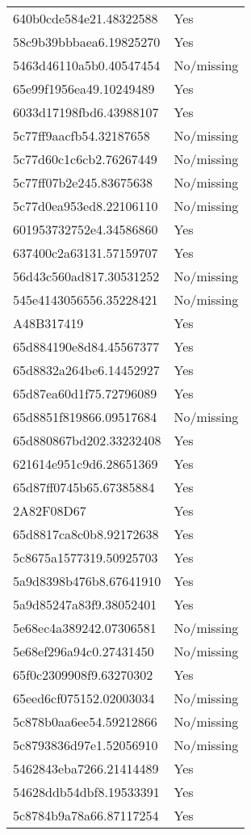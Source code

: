 \begin{tabular}{ll}
640b0cde584e21.48322588 & Yes \\
58c9b39bbbaea6.19825270 & Yes \\
5463d46110a5b0.40547454 & No/missing \\
65e99f1956ea49.10249489 & Yes \\
6033d17198fbd6.43988107 & Yes \\
5c77ff9aacfb54.32187658 & No/missing \\
5c77d60c1c6cb2.76267449 & No/missing \\
5c77ff07b2e245.83675638 & No/missing \\
5c77d0ea953ed8.22106110 & No/missing \\
601953732752e4.34586860 & Yes \\
637400c2a63131.57159707 & Yes \\
56d43c560ad817.30531252 & No/missing \\
545e4143056556.35228421 & No/missing \\
A48B317419 & Yes \\
65d884190e8d84.45567377 & Yes \\
65d8832a264be6.14452927 & Yes \\
65d87ea60d1f75.72796089 & Yes \\
65d8851f819866.09517684 & No/missing \\
65d880867bd202.33232408 & Yes \\
621614e951c9d6.28651369 & Yes \\
65d87ff0745b65.67385884 & Yes \\
2A82F08D67 & Yes \\
65d8817ca8c0b8.92172638 & Yes \\
5c8675a1577319.50925703 & Yes \\
5a9d8398b476b8.67641910 & Yes \\
5a9d85247a83f9.38052401 & Yes \\
5e68ec4a389242.07306581 & No/missing \\
5e68ef296a94c0.27431450 & No/missing \\
65f0c2309908f9.63270302 & Yes \\
65eed6cf075152.02003034 & No/missing \\
5c878b0aa6ee54.59212866 & No/missing \\
5c8793836d97e1.52056910 & No/missing \\
5462843eba7266.21414489 & Yes \\
54628ddb54dbf8.19533391 & Yes \\
5c8784b9a78a66.87117254 & Yes \\

\end{tabular}
